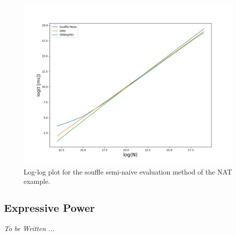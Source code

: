 \begin{figure}[!ht]
	\includegraphics[width=.9\linewidth, height=12\baselineskip]{img/souffleloglog.png}
	\caption{Log-log plot for the souffle semi-naive evaluation method of the NAT example.}
	\label{figure:souffleloglog}
\end{figure}

\subsection{Expressive Power}
\textit{To be Written ... }